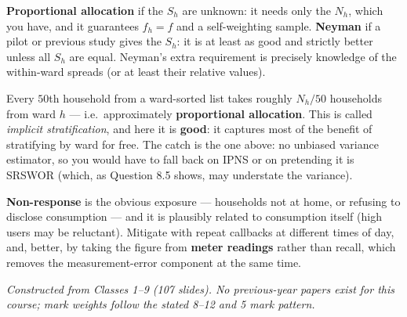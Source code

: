  \textbf{Proportional allocation} if the $S_h$ are unknown: it needs only the $N_h$, which
you have, and it guarantees $f_h=f$ and a self-weighting sample. \textbf{Neyman} if a pilot or
previous study gives the $S_h$: it is at least as good and strictly better unless all $S_h$ are
equal. Neyman's extra requirement is precisely knowledge of the within-ward spreads (or at least
their relative values).

 Every $50$th household from a ward-sorted list takes roughly $N_h/50$ households from ward
$h$ --- i.e.\ approximately \textbf{proportional allocation}. This is called \emph{implicit
stratification}, and here it is \textbf{good}: it captures most of the benefit of stratifying by
ward for free. The catch is the one above: no unbiased variance estimator, so you would have to
fall back on IPNS or on pretending it is SRSWOR (which, as Question 8.5 shows, may understate the
variance).

 \textbf{Non-response} is the obvious exposure --- households not at home, or refusing to
disclose consumption --- and it is plausibly related to consumption itself (high users may be
reluctant). Mitigate with repeat callbacks at different times of day, and, better, by taking the
figure from \textbf{meter readings} rather than recall, which removes the measurement-error
component at the same time.

\vfill
\begin{center}\small\itshape
Constructed from Classes 1--9 (107 slides). No previous-year papers exist for this course;
mark weights follow the stated 8--12 and 5 mark pattern.
\end{center}
